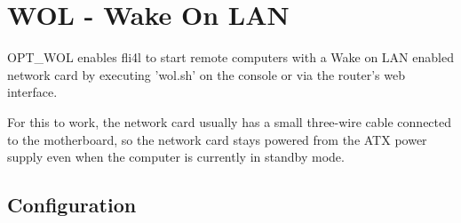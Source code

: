 {
\section {WOL - Wake On LAN}
}
OPT\_WOL enables fli4l to start remote computers with a Wake on LAN
enabled network card by executing 'wol.sh' on the console or via the
router's web interface.

For this to work, the network card usually has a small three-wire cable
connected to the motherboard, so the network card stays powered from
the ATX power supply even when the computer is currently in standby mode.

\subsection {Configuration}

